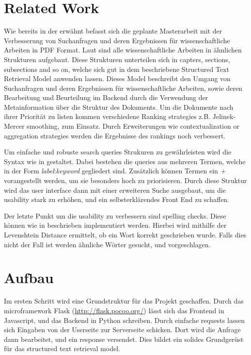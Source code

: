 \documentclass[a4paper, 12pt]{scrartcl}
\begin{document}
\section{Related Work}

Wie bereits in der  erwähnt befasst sich die geplante Masterarbeit mit der Verbesserung von Suchanfragen und deren Ergebnissen für wissenschaftliche Arbeiten in PDF Format. Laut 
\cite{KGJK14} sind alle wissenschaftliche Arbeiten in ähnlichen Strukturen aufgebaut. Diese Strukturen unterteilen sich in capters, sections, subsections and so on, welche sich gut in dem \cite{RNBY99} 
beschriebene Structured Text Retrieval Model anwenden lassen. Dieses Model beschreibt den Umgang von Suchanfragen und deren Ergebnissen für wissenschaftliche Arbeiten, sowie deren Bearbeitung und Beurteilung 
im Backend durch die Verwendung der Metainformation über die Struktur des Dokuments. Um die Dokumente nach ihrer Priorität zu listen kommen verschiedene Ranking strategies z.B. Jelinek-Mercer smoothing, zum 
Einsatz. Durch Erweiterungen wie contextualization or aggregation strategies werden die Ergebnisse des rankings noch verbessert.

Um einfache und robuste search queries Strukuren zu gewährleisten wird die Syntax wie in \cite{Coh03} gestaltet. Dabei bestehen die queries aus mehreren Termen, welche in der Form \textit{label}:\textit{keyword} 
gegliedert sind. Zusätzlich können Termen ein \textit{+} vorangestellt werden, um sie besonders hoch zu priorisieren. Durch diese Struktur wird das user interface dann mit einer erweiteren Suche ausgebaut, um 
die usability stark zu erhöhen, und ein selbsterklärendes Front End zu schaffen.

Der letzte Punkt um die usability zu verbessern sind spelling checks. Diese können wie in \cite{SPCB13} beschrieben implementiert werden. Hierbei wird mithilfe der Levenshtein Distance ermittelt, ob ein Wort
korrekt geschrieben wurde. Falls dies nicht der Fall ist werden ähnliche Wörter gesucht, und vorgeschlagen. 

\section{Aufbau}

Im ersten Schritt wird eine Grundstruktur für das Projekt geschaffen. Durch das microframework Flask (\url{http://flask.pocoo.org/}) lässt sich das Frontend in Javascript, und das Backend in Python schreiben.
Durch einfache requests lassen sich Eingaben von der Userseite zur Serverseite schicken. Dort wird die Anfrage dann bearbeitet, und ein response versendet. Dies bildet ein solides Grundgerüst für das 
structured text retrieval model.
\end{document}
